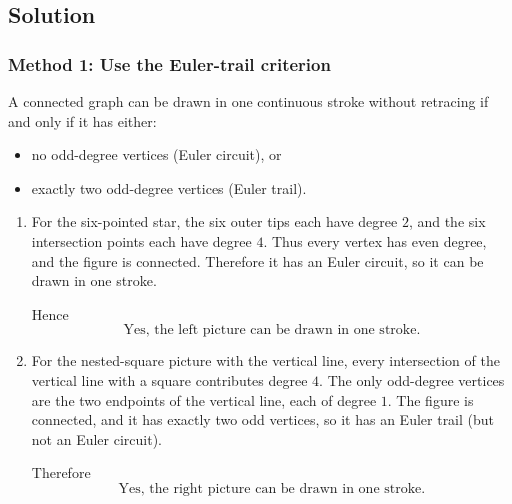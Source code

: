 \documentclass[12pt]{article}
\begin{document}
\subsection{Solution}

\subsubsection{Method 1: Use the Euler-trail criterion}
A connected graph can be drawn in one continuous stroke without retracing if and only if it has either:
\begin{itemize}[leftmargin=*]
  \item no odd-degree vertices (Euler circuit), or
  \item exactly two odd-degree vertices (Euler trail).
\end{itemize}

\begin{enumerate}[label=(\alph*)]
\item For the six-pointed star, the six outer tips each have degree \(2\), and the six intersection points each have degree \(4\). Thus every vertex has even degree, and the figure is connected. Therefore it has an Euler circuit, so it can be drawn in one stroke.

Hence
\[
\boxed{\text{Yes, the left picture can be drawn in one stroke.}}
\]

\item For the nested-square picture with the vertical line, every intersection of the vertical line with a square contributes degree \(4\). The only odd-degree vertices are the two endpoints of the vertical line, each of degree \(1\). The figure is connected, and it has exactly two odd vertices, so it has an Euler trail (but not an Euler circuit).

Therefore
\[
\boxed{\text{Yes, the right picture can be drawn in one stroke.}}
\]
\end{enumerate}

\newpage
\end{document}
